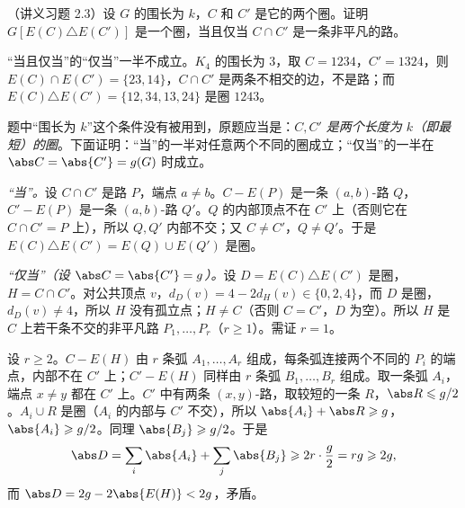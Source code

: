 \begin{workedexample}\label{we:augmenting-paths:cycle-intersection}
（讲义习题 2.3）设 $G$ 的围长为 $k$，$C$ 和 $C'$ 是它的两个圈。证明 $G[E(C)\triangle E(C')]$ 是一个圈，当且仅当 $C\cap C'$ 是一条非平凡的路。
\end{workedexample}
\begin{remark}[讲义原题有误]
“当且仅当”的“仅当”一半不成立。$K_4$ 的围长为 $3$，取 $C=1234$，$C'=1324$，则 $E(C)\cap E(C')=\{23,14\}$，$C\cap C'$ 是两条不相交的边，不是路；而 $E(C)\triangle E(C')=\{12,34,13,24\}$ 是圈 $1243$。

题中“围长为 $k$”这个条件没有被用到，原题应当是：\emph{$C,C'$ 是两个长度为 $k$（即最短）的圈}。下面证明：“当”的一半对任意两个不同的圈成立；“仅当”的一半在 $\abs C=\abs{C'}=g(G)$ 时成立。
\end{remark}
\begin{solution}
\emph{“当”。}设 $C\cap C'$ 是路 $P$，端点 $a\neq b$。$C-E(P)$ 是一条 $(a,b)$-路 $Q$，$C'-E(P)$ 是一条 $(a,b)$-路 $Q'$。$Q$ 的内部顶点不在 $C'$ 上（否则它在 $C\cap C'=P$ 上），所以 $Q,Q'$ 内部不交；又 $C\neq C'$，$Q\neq Q'$。于是 $E(C)\triangle E(C')=E(Q)\cup E(Q')$ 是圈。

\emph{“仅当”（设 $\abs C=\abs{C'}=g$）。}设 $D=E(C)\triangle E(C')$ 是圈，$H=C\cap C'$。对公共顶点 $v$，$d_D(v)=4-2d_H(v)\in\{0,2,4\}$，而 $D$ 是圈，$d_D(v)\neq4$，所以 $H$ 没有孤立点；$H\neq C$（否则 $C=C'$，$D$ 为空）。所以 $H$ 是 $C$ 上若干条不交的非平凡路 $P_1,\dots,P_r$（$r\geqslant1$）。需证 $r=1$。

设 $r\geqslant2$。$C-E(H)$ 由 $r$ 条弧 $A_1,\dots,A_r$ 组成，每条弧连接两个不同的 $P_i$ 的端点，内部不在 $C'$ 上；$C'-E(H)$ 同样由 $r$ 条弧 $B_1,\dots,B_r$ 组成。取一条弧 $A_i$，端点 $x\neq y$ 都在 $C'$ 上。$C'$ 中有两条 $(x,y)$-路，取较短的一条 $R$，$\abs R\leqslant g/2$。$A_i\cup R$ 是圈（$A_i$ 的内部与 $C'$ 不交），所以 $\abs{A_i}+\abs R\geqslant g$，$\abs{A_i}\geqslant g/2$。同理 $\abs{B_j}\geqslant g/2$。于是
\[
\abs D=\sum_i\abs{A_i}+\sum_j\abs{B_j}\geqslant2r\cdot\frac g2=rg\geqslant2g,
\]
而 $\abs D=2g-2\abs{E(H)}<2g$，矛盾。
\end{solution}

